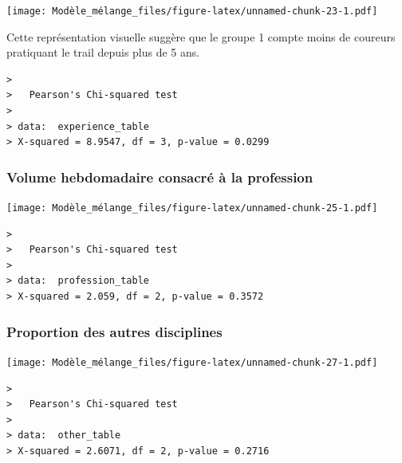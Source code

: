 \documentclass[
]{article}
\let\origfigure\figure
\let\endorigfigure\endfigure
\renewenvironment{figure}[1][2]{
    \expandafter\origfigure\expandafter[H]
} {
    \endorigfigure
}
\begin{document}
\begin{figure}
\centering
\texttt{[image: Modèle\_mélange\_files/figure-latex/unnamed-chunk-23-1.pdf]}
\caption{Répartition du temps d'expérience en trail}
\end{figure}

Cette représentation visuelle suggère que le groupe 1 compte moins de
coureurs pratiquant le trail depuis plus de 5 ans.

\begin{verbatim}
> 
>   Pearson's Chi-squared test
> 
> data:  experience_table
> X-squared = 8.9547, df = 3, p-value = 0.0299
\end{verbatim}

\hypertarget{volume-hebdomadaire-consacruxe9-uxe0-la-profession}{%
\subsubsection{Volume hebdomadaire consacré à la
profession}\label{volume-hebdomadaire-consacruxe9-uxe0-la-profession}}

\begin{figure}
\centering
\texttt{[image: Modèle\_mélange\_files/figure-latex/unnamed-chunk-25-1.pdf]}
\caption{Répartition du volume hebdomadaire consacré à la profession
chez les courreurs}
\end{figure}

\begin{verbatim}
> 
>   Pearson's Chi-squared test
> 
> data:  profession_table
> X-squared = 2.059, df = 2, p-value = 0.3572
\end{verbatim}

\hypertarget{proportion-des-autres-disciplines}{%
\subsubsection{Proportion des autres
disciplines}\label{proportion-des-autres-disciplines}}

\begin{figure}
\centering
\texttt{[image: Modèle\_mélange\_files/figure-latex/unnamed-chunk-27-1.pdf]}
\caption{Proportion de ces autres disciplines dans le volume total
d'entraînement}
\end{figure}

\begin{verbatim}
> 
>   Pearson's Chi-squared test
> 
> data:  other_table
> X-squared = 2.6071, df = 2, p-value = 0.2716
\end{verbatim}
\end{document}
